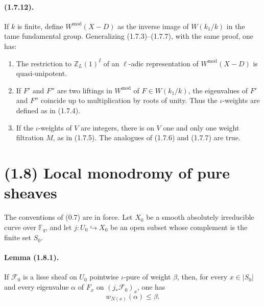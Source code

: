 \documentclass[11pt]{article}
\theoremstyle{remark}
\newcommand{\ZZ}{\mathbb{Z}}
\newcommand{\Fq}{\mathbb{F}_q}
\begin{document}
\paragraph{(1.7.12).}
If $k$ is finite, define $W^{\mathrm{mod}}(X-D)$ as the inverse image of $W(k_1/k)$ in the tame fundamental group. Generalizing (1.7.3)--(1.7.7), with the same proof, one has:
\begin{enumerate}[label=(1.7.12.\arabic*)]
\item The restriction to $\ZZ_L(1)^I$ of an $\ell$-adic representation of $W^{\mathrm{mod}}(X-D)$ is quasi-unipotent.
\item If $F'$ and $F''$ are two liftings in $W^{\mathrm{mod}}$ of $F\in W(k_1/k)$, the eigenvalues of $F'$ and $F''$ coincide up to multiplication by roots of unity. Thus the $\iota$-weights are defined as in (1.7.4).
\item If the $\iota$-weights of $V$ are integers, there is on $V$ one and only one weight filtration $M$, as in (1.7.5). The analogues of (1.7.6) and (1.7.7) are true.
\end{enumerate}

\section*{(1.8) Local monodromy of pure sheaves}

The conventions of (0.7) are in force. Let $X_0$ be a smooth absolutely irreducible curve over $\Fq$, and let $j:U_0\hookrightarrow X_0$ be an open subset whose complement is the finite set $S_0$.

\paragraph{Lemma (1.8.1).}
If $\mathcal F_0$ is a lisse sheaf on $U_0$ pointwise $\iota$-pure of weight $\beta$, then, for every $x\in |S_0|$ and every eigenvalue $\alpha$ of $F_x$ on $(j_*\mathcal F_0)_x$, one has
\[
w_{N(x)}(\alpha)\le \beta.
\]
\end{document}
